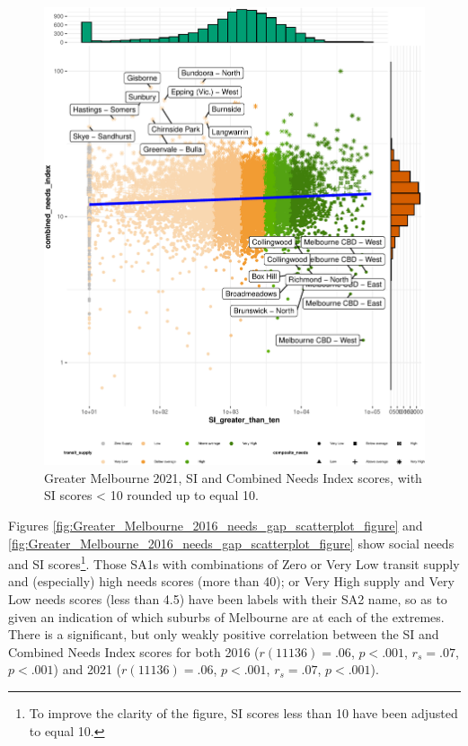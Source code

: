 \documentclass[preprint, 3p,
authoryear]{elsarticle} %
\begin{document}
\begin{figure}
\centering
\includegraphics{Leveraging_GTFS_to_assess_transit_supply_Transport_Geography_files/figure-latex/Greater_Melbourne_2021_needs_gap_scatterplot_figure-1.pdf}
\caption{Greater Melbourne 2021, SI and Combined Needs Index scores,
with SI scores \textless{} 10 rounded up to equal 10.}
\end{figure}

Figures \ref{fig:Greater_Melbourne_2016_needs_gap_scatterplot_figure}
and \ref{fig:Greater_Melbourne_2016_needs_gap_scatterplot_figure} show
social needs and SI scores\footnote{To improve the clarity of the
  figure, SI scores less than 10 have been adjusted to equal 10.}. Those
SA1s with combinations of Zero or Very Low transit supply and
(especially) high needs scores (more than 40); or Very High supply and
Very Low needs scores (less than 4.5) have been labels with their SA2
name, so as to given an indication of which suburbs of Melbourne are at
each of the extremes. There is a significant, but only weakly positive
correlation between the SI and Combined Needs Index scores for both 2016
(\(r(11136) = .06\), \(p < .001\), \(r_s =.07\), \(p < .001\)) and 2021
(\(r(11136) = .06\), \(p < .001\), \(r_s =.07\), \(p < .001\)).
\end{document}
